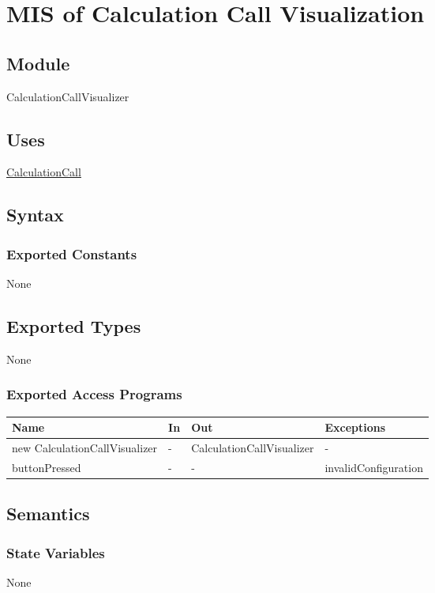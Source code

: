 \documentclass[12pt, titlepage]{article}
\begin{document}
\newpage
\section{MIS of Calculation Call Visualization} \label{CalculationCallVisualizer}

\subsection{Module}

CalculationCallVisualizer

\subsection{Uses}
\hyperref[CalculationCall]{CalculationCall} 

\subsection{Syntax}

\subsubsection{Exported Constants}
None
\subsection{Exported Types}
None

\subsubsection{Exported Access Programs}
\begin{center}
\begin{tabular}{p{6cm} p{1cm} p{5cm} p{4.5cm}}
\hline
\textbf{Name} & \textbf{In} & \textbf{Out} & \textbf{Exceptions} \\
\hline
new CalculationCallVisualizer & - & CalculationCallVisualizer & - \\
\hline
buttonPressed & - & - & invalidConfiguration \\
\hline
\end{tabular}
\end{center}

\subsection{Semantics}

\subsubsection{State Variables}
None
\end{document}
